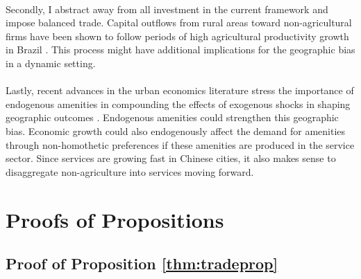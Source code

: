 \documentclass[]{article}
\theoremstyle{plain}
\begin{document}
\paragraph*{}
Secondly, I abstract away from all investment in the current framework and impose balanced trade. Capital outflows from rural areas toward non-agricultural firms have been shown to follow periods of high agricultural productivity growth in Brazil \citep{bustos2020etal}. This process might have additional implications for the geographic bias in a dynamic setting.   
\paragraph*{}
Lastly, recent advances in the urban economics literature stress the importance of endogenous amenities in compounding the effects of exogenous shocks in shaping geographic outcomes \citep{diamond2016}. Endogenous amenities could strengthen this geographic bias. Economic growth could also endogenously affect the demand for amenities through non-homothetic preferences if these amenities are produced in the service sector. Since services are growing fast in Chinese cities, it also makes sense to disaggregate non-agriculture into services moving forward.  

\paragraph*{}





\newpage
\clearpage
\nocite{*}
\scriptsize





\newpage
\appendix
\normalsize
\section{Proofs of Propositions}\label{appendix:proofs}

\subsection*{Proof of Proposition \ref{thm:tradeprop}}
\paragraph*{}
\end{document}

